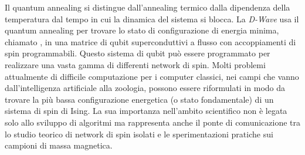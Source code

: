\cite{QAS}Il quantum annealing si distingue dall'annealing termico dalla dipendenza della temperatura dal tempo in cui la dinamica del sistema si blocca. La \textit{D-Wave} usa il quantum annealing per trovare lo stato di configurazione di energia minima, chiamato , in una matrice di qubit superconduttivi a flusso con accoppiamenti di spin programmabili. Questo sistema di qubit può essere programmato per realizzare una vasta gamma di differenti network di spin. Molti problemi attualmente di difficile computazione per i computer classici, nei campi che vanno dall'intelligenza artificiale alla zoologia, possono essere riformulati in modo da trovare la più bassa configurazione energetica (o stato fondamentale) di un sistema di spin di Ising. La sua importanza nell'ambito scientifico non è legata solo allo sviluppo di algoritmi ma rappresenta anche il ponte di comunicazione tra lo studio teorico di network di spin isolati e le sperimentazioni pratiche sui campioni di massa magnetica.


